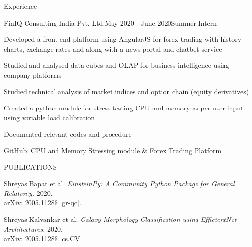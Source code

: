 \documentclass{resume} %
\begin{document}
\smallskip
\smallskip
\smallskip
\begin{rSection}{Experience}

\begin{rSubsection}{FinIQ Consulting India Pvt. Ltd.}{May 2020 - June 2020}{Summer Intern}{}
\item Developed a front-end platform using AngularJS for forex trading with history charts, exchange rates and along with a news portal and chatbot service
\item Studied and analysed data cubes and OLAP for business intelligence using company platforms
\item Studied technical analysis of market indices and option chain (equity derivatives)
\item Created a python module for stress testing CPU and memory as per user input using variable load calibration
\item Documented relevant codes and procedure
\item GitHub: \href{https://github.com/obi-wan-shinobi/Stress-test}{CPU and Memory Stressing module} \& \href{https://github.com/obi-wan-shinobi/Forex-Trading}{Forex Trading Platform}
\end{rSubsection}


\end{rSection}
\smallskip
\smallskip
\smallskip

\begin{rSection}{PUBLICATIONS}
\item Shreyas Bapat et al. \textit{EinsteinPy: A Community Python Package for General Relativity.} 2020.\\ arXiv: \href{https://arxiv.org/abs/2005.11288}{2005.11288 [gr-qc]}.

\item Shreyas Kalvankar et al. \textit{Galaxy Morphology Classification using EfficientNet Architectures.} 2020.\\ arXiv:
\href{https://arxiv.org/abs/2008.13611}{2005.11288 [cs.CV]}.

\end{rSection}
\end{document}
